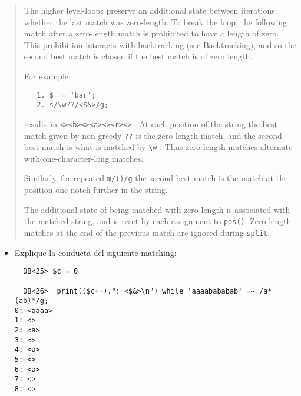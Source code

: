 \begin{it}
\begin{quote}
The higher level-loops preserve an additional state between iterations:
whether the last match was zero-length. To break the loop, the following
match after a zero-length match is prohibited to have a length of
zero. This prohibition interacts with backtracking (see Backtracking), and
so the second best match is chosen if the best match is of zero length.

For example:

\begin{verbatim}
   1. $_ = 'bar';
   2. s/\w??/<$&>/g;
\end{verbatim}

results in \verb|<><b><><a><><r><>| . At each position of the string the best
match given by non-greedy \verb|??| is the zero-length match, and the second
best match is what is matched by \verb|\w| . Thus zero-length matches alternate
with one-character-long matches.

Similarly, for repeated \verb|m/()/g| the second-best match is the match at
the position one notch further in the string.

The additional state of being matched with zero-length is associated with
the matched string, and is reset by each assignment to \verb|pos()|. Zero-length
matches at the end of the previous match are ignored during \verb|split|.
\end{quote}
\end{it}

\begin{exercise}
\begin{itemize}
\item
Explique la conducta del siguiente matching:
\begin{latexonly}
\begin{verbatim}
  DB<25> $c = 0

  DB<26>  print(($c++).": <$&>\n") while 'aaaabababab' =~ /a*(ab)*/g;
0: <aaaa>
1: <>
2: <a>
3: <>
4: <a>
5: <>
6: <a>
7: <>
8: <>
\end{verbatim}
\end{latexonly}
\end{itemize}
\end{exercise}

